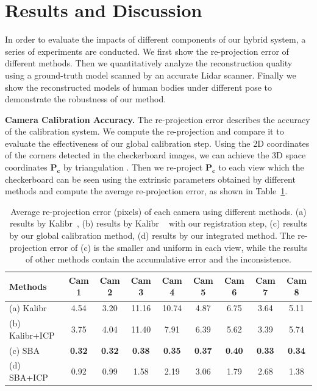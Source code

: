 
\section{Results and Discussion}
\label{sec:Results}

In order to evaluate the impacts of different components of our hybrid system, a series of experiments are conducted. We first show the re-projection error of different methods. Then we quantitatively analyze the reconstruction quality using a ground-truth model scanned by an accurate Lidar scanner.  
Finally we show the reconstructed models of human bodies under different pose to demonstrate the robustness of our method.


\noindent\textbf{Camera Calibration Accuracy.} 
%
The re-projection error describes the accuracy of the calibration system. 
We compute the re-projection and compare it to evaluate the effectiveness of our global calibration step.
%
Using the 2D coordinates of the corners detected in the checkerboard images, we can achieve the 3D space coordinates $\mathbf{P_{c}}$ by triangulation . 
Then we re-project $\mathbf{P_{c}}$ to each view which the checkerboard can be seen using the extrinsic parameters obtained by different methods and compute the average re-projection error, as shown in Table~\ref{tab:reprojection}.


\begin{table}
	\centering
	\caption{Average re-projection error (pixels) of each camera using different methods. (a) results by Kalibr~\cite{Maye2013Self}, (b) results by Kalibr ~\cite{Maye2013Self} with our registration step, (c) results by our global calibration method, (d) results by our integrated method. The re-projection error of (c) is the smaller and uniform in each view, while the results of other methods contain the accumulative error and the inconsistence. }
	\label{tab:reprojection}
	\begin{tabular}{lcccccccc}
		\hline
		Methods & Cam 1 & Cam 2 & Cam 3 & Cam 4 & Cam 5 & Cam 6 & Cam 7 & Cam 8\\
		\hline
		(a) Kalibr &4.54 &3.20 &11.16 &10.74 &4.87 &6.75 &3.64 &5.11\\

		(b) Kalibr+ICP &3.75 &4.04 &11.40 &7.91 &6.39 &5.62 &3.39 &5.74\\
		
		(c) SBA   &\textbf{0.32} &\textbf{0.32} &\textbf{0.38}  &\textbf{0.35} &\textbf{0.37} &\textbf{0.40} &\textbf{0.33} &\textbf{0.34} \\
		
		(d) SBA+ICP &0.92 &0.99 &1.58 &2.19 &3.06 &1.79 &2.68 &1.38\\
		\hline
		
	\end{tabular}


\end{table}


